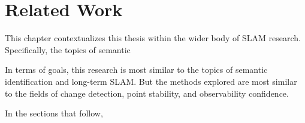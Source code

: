 \section{Related Work}
\label{sec:related_work}

This chapter contextualizes this thesis within the wider body of SLAM research. Specifically, the topics of semantic 

In terms of goals, this research is most similar to the topics of semantic identification and long-term SLAM. But the methods explored are most similar to the fields of change detection, point stability, and observability confidence.

In the sections that follow,
% 